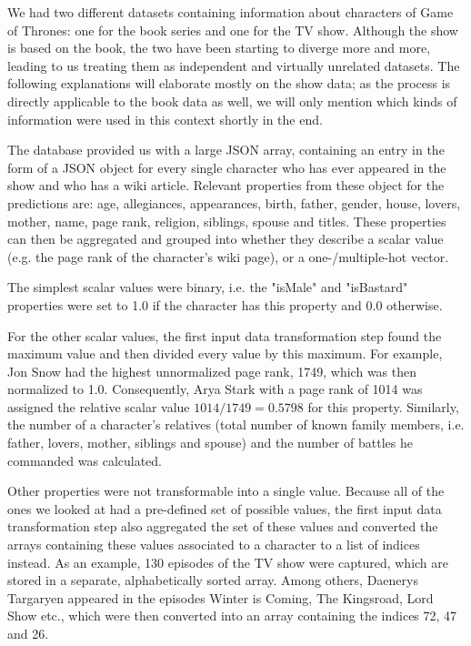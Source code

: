 \documentclass{bioinfo}
\begin{document}
We had two different datasets containing information about characters of Game of Thrones: one for the book series and one for the TV show. Although the show is based on the book, the two have been starting to diverge more and more, leading to us treating them as independent and virtually unrelated datasets. The following explanations will elaborate mostly on the show data; as the process is directly applicable to the book data as well, we will only mention which kinds of information were used in this context shortly in the end.

The database provided us with a large JSON array, containing an entry in the form of a JSON object for every single character who has ever appeared in the show and who has a wiki article. Relevant properties from these object for the predictions are: age, allegiances, appearances, birth, father, gender, house, lovers, mother, name, page rank, religion, siblings, spouse and titles. These properties can then be aggregated and grouped into whether they describe a scalar value (e.g. the page rank of the character's wiki page), or a one-/multiple-hot vector.

The simplest scalar values were binary, i.e. the "isMale" and "isBastard" properties were set to 1.0 if the character has this property and 0.0 otherwise.

For the other scalar values, the first input data transformation step found the maximum value and then divided every value by this maximum. For example, Jon Snow had the highest unnormalized page rank, 1749, which was then normalized to 1.0. Consequently, Arya Stark with a page rank of 1014 was assigned the relative scalar value $1014/1749=0.5798$ for this property. Similarly, the number of a character's relatives (total number of known family members, i.e. father, lovers, mother, siblings and spouse) and the number of battles he commanded was calculated.

Other properties were not transformable into a single value. Because all of the ones we looked at had a pre-defined set of possible values, the first input data transformation step also aggregated the set of these values and converted the arrays containing these values associated to a character to a list of indices instead. As an example, 130 episodes of the TV show were captured, which are stored in a separate, alphabetically sorted array. Among others, Daenerys Targaryen appeared in the episodes Winter is Coming, The Kingsroad, Lord Show etc., which were then converted into an array containing the indices 72, 47 and 26.
\end{document}
